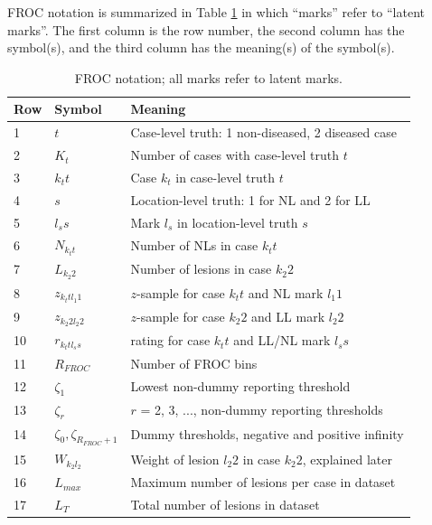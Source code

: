 \documentclass[
]{book}
\begin{document}
FROC notation is summarized in Table \ref{tab:empirical-notation} in which ``marks'' refer to ``latent marks''. The first column is the row number, the second column has the symbol(s), and the third column has the meaning(s) of the symbol(s).

\begin{table}

\caption{\label{tab:empirical-notation}FROC notation; all marks refer to latent marks.}
\centering
\begin{tabular}[t]{l|l|l}
\hline
Row & Symbol & Meaning\\
\hline
1 & $t$ & Case-level truth: 1 non-diseased, 2 diseased case\\
\hline
2 & $K_t$ & Number of cases with case-level truth $t$\\
\hline
3 & $k_t t$ & Case $k_t$ in case-level truth $t$\\
\hline
4 & $s$ & Location-level truth: 1 for NL and 2 for LL\\
\hline
5 & $l_s s$ & Mark $l_s$ in location-level truth $s$\\
\hline
6 & $N_{k_t t}$ & Number of NLs in case $k_t t$\\
\hline
7 & $L_{k_2 2}$ & Number of lesions in case $k_2 2$\\
\hline
8 & $z_{k_t t l_1 1}$ & $z$-sample for case $k_t t$ and NL mark $l_1 1$\\
\hline
9 & $z_{k_2 2 l_2 2}$ & $z$-sample for case $k_2 2$ and LL mark $l_2 2$\\
\hline
10 & $r_{k_t t l_s s}$ & rating for case $k_t t$ and LL/NL mark $l_s s$\\
\hline
11 & $R_{FROC}$ & Number of FROC bins\\
\hline
12 & $\zeta_1$ & Lowest non-dummy reporting threshold\\
\hline
13 & $\zeta_r$ & $r$ = 2, 3, ..., non-dummy reporting thresholds\\
\hline
14 & $\zeta_0, \zeta_{R_{FROC}+1}$ & Dummy thresholds, negative and positive infinity\\
\hline
15 & $W_{k_2 l_2}$ & Weight of lesion $l_2 2$ in case $k_2 2$, explained later\\
\hline
16 & $L_{max}$ & Maximum number of lesions per case in dataset\\
\hline
17 & $L_T$ & Total number of lesions in dataset\\
\hline
\end{tabular}
\end{table}
\end{document}
